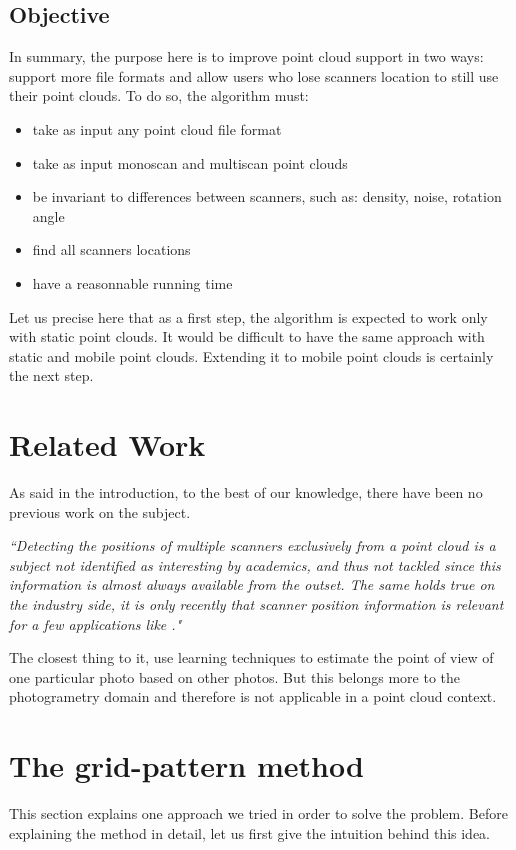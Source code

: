 \subsection{Objective}
In summary, the purpose here is to improve \CC point cloud support in two ways: support more file formats and allow users who lose scanners location to still use their point clouds. To do so, the algorithm must:
\begin{itemize}
\item take as input any point cloud file format
\item take as input monoscan and multiscan point clouds
\item be invariant to differences between scanners, such as: density, noise, rotation angle
\item find all scanners locations
\item have a reasonnable running time
\end{itemize}

Let us precise here that as a first step, the algorithm is expected to work only with static point clouds. It would be difficult to have the same approach with static and mobile point clouds. Extending it to mobile point clouds is certainly the next step.

\section{Related Work}
\label{sc:work}
As said in the introduction, to the best of our knowledge, there have been no previous work on the subject.

\emph{``Detecting the positions of multiple scanners exclusively from a point cloud is a subject not identified as interesting by academics, and thus not tackled since this information is almost always available from the outset. The same holds true on the industry side, it is only recently that scanner position information is relevant for a few applications like \CC."}

The closest thing to it,  \cite{ml1, ml2, ml3, ml4, ml5} use learning techniques to estimate the point of view of one particular photo based on other photos. But this belongs more to the photogrametry domain and therefore is not applicable in a point cloud context.


\section{The grid-pattern method}
\label{sc:grid-pattern}
This section explains one approach we tried in order to solve the problem. Before explaining the method in detail, let us first give the intuition behind this idea.

